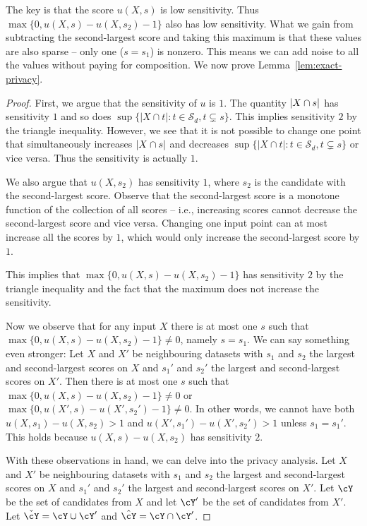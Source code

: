 The key is that the score $u(X,s)$ is low sensitivity. Thus
$\max\{ 0 , u(X,s) - u(X,s_2) -1\}$ also has low sensitivity.
What we gain from subtracting the second-largest score and
taking this maximum is that these values are also sparse -- only
one ($s=s_1$) is nonzero. This means we can add noise to all
the values without paying for composition. We now prove
Lemma~\ref{lem:exact-privacy}.

\begin{proof}
    First, we argue that the sensitivity of $u$ is
    $1$. %
    The quantity $\left| X \cap s \right|$ has sensitivity $1$ and so does
    $\sup \{ |X \cap t| : t \in \mathcal{S}_d, t \subsetneq s \}$.
    This implies sensitivity $2$ by the triangle inequality.
    However, we see that it is not possible to change one point
    that simultaneously increases $\left| X \cap s \right|$ and decreases
    $\sup \{ |X \cap t| : t \in \mathcal{S}_d, t \subsetneq s \}$
    or vice versa. Thus the sensitivity is actually $1$.

    We also argue that $u(X,s_2)$ has sensitivity $1$, where $s_2$
    is the candidate with the second-largest score.
    Observe that the second-largest score is a monotone function of
    the collection of all scores -- i.e., increasing scores cannot
    decrease the second-largest score and vice versa.
    Changing one input point can at most increase all the scores by
    $1$, which would only increase the second-largest score by $1$.

    This implies that $\max\{ 0, u(X,s) - u(X,s_2) -1 \}$ has sensitivity
    $2$ by the triangle inequality and the fact that the maximum does
    not increase the sensitivity.

    Now we observe that for any input $X$ there is at most one $s$ such
    that $\max\{ 0, u(X,s) - u(X,s_2) -1 \} \ne 0$, namely $s=s_1$.
    We can say something even stronger: Let $X$ and $X'$ be neighbouring
    datasets with $s_1$ and $s_2$ the largest and second-largest scores
    on $X$ and $s_1'$ and $s_2'$ the largest and second-largest scores
    on $X'$. Then there is at most one $s$ such that
    $\max\{ 0, u(X,s) - u(X,s_2) -1 \} \ne 0$ or $\max\{ 0, u(X',s) - u(X',s_2') -1 \} \ne 0$.
    In other words, we cannot have both $u(X,s_1) - u(X,s_2) >1$ and
    $u(X',s_1') - u(X',s_2') >1$ unless $s_1=s_1'$. This holds because
    $u(X,s) - u(X,s_2)$ has sensitivity $2$.

    With these observations in hand, we can delve into the privacy
    analysis. Let $X$ and $X'$ be neighbouring datasets with $s_1$
    and $s_2$ the largest and second-largest scores on $X$ and $s_1'$
    and $s_2'$ the largest and second-largest scores on $X'$. Let $\cY$
    be the set of candidates from $X$ and let $\cY'$ be the set of
    candidates from $X'$. Let $\check \cY = \cY \cup \cY'$ and
    $\hat \cY = \cY \cap \cY'$.


\end{proof}
